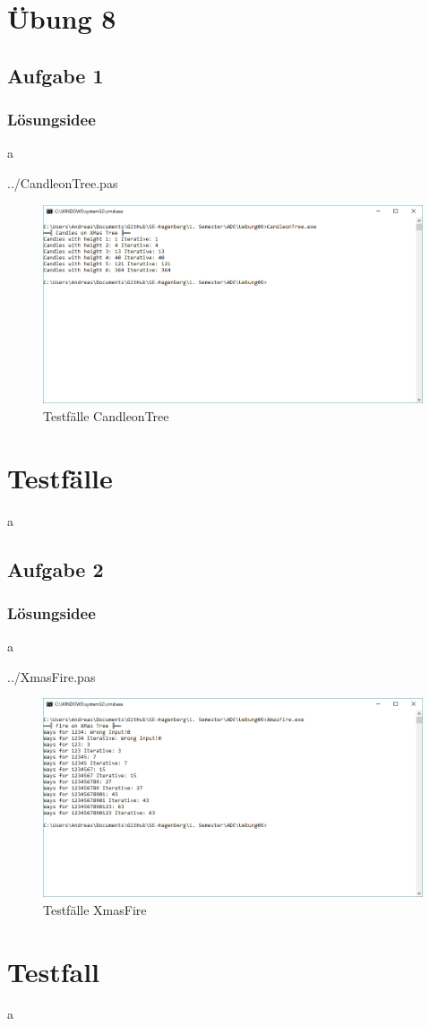 \section*{Übung 8}
\subsection*{Aufgabe 1}
\subsubsection*{Lösungsidee}
a
\newline

 {../CandleonTree.pas}
\begin{figure}[H]
	\centering
	\includegraphics[scale=0.65]{./pictures/CandleonTree.png}
	\caption{Testfälle CandleonTree}
	\label{fig: BigInts}
\end{figure}

\section*{Testfälle}
a
\newpage

\subsection*{Aufgabe 2}
\subsubsection*{Lösungsidee}
a
\newline

 {../XmasFire.pas}
\begin{figure}[H]
	\centering
	\includegraphics[scale=0.65]{./pictures/XmasFire.png}
	\caption{Testfälle XmasFire}
	\label{fig: WLA}
\end{figure}

\section*{Testfall}
a
\newpage



